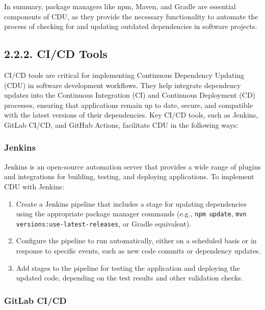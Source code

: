 \documentclass[10pt]{article}
\begin{document}
In summary, package managers like npm, Maven, and Gradle are essential components of CDU, as they provide the necessary functionality to automate the process of checking for and updating outdated dependencies in software projects.

\subsection*{2.2.2. CI/CD Tools}

CI/CD tools are critical for implementing Continuous Dependency Updating (CDU) in software development workflows. They help integrate dependency updates into the Continuous Integration (CI) and Continuous Deployment (CD) processes, ensuring that applications remain up to date, secure, and compatible with the latest versions of their dependencies. Key CI/CD tools, such as Jenkins, GitLab CI/CD, and GitHub Actions, facilitate CDU in the following ways:

\subsubsection*{Jenkins}

Jenkins is an open-source automation server that provides a wide range of plugins and integrations for building, testing, and deploying applications. To implement CDU with Jenkins:

\begin{enumerate}

  \item Create a Jenkins pipeline that includes a stage for updating dependencies using the appropriate package manager commands (e.g., \texttt{npm update}, \texttt{mvn versions:use-latest-releases}, or Gradle equivalent).

  \item Configure the pipeline to run automatically, either on a scheduled basis or in response to specific events, such as new code commits or dependency updates.

  \item Add stages to the pipeline for testing the application and deploying the updated code, depending on the test results and other validation checks.

\end{enumerate}

\subsubsection*{GitLab CI/CD}
\end{document}
